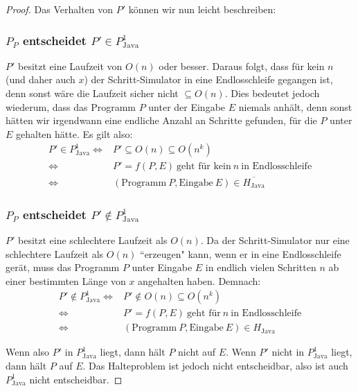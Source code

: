 \documentclass[journal]{IEEEtran}
\begin{document}
\begin{proof}
Das Verhalten von $P'$ können wir nun leicht beschreiben:

\subsubsection{$P_P$ entscheidet $P' \in P_\text{Java}^1$}

$P'$ besitzt eine Laufzeit von $O(n)$ oder besser. Daraus folgt, dass für kein $n$ (und daher auch $x$) der Schritt-Simulator in eine Endlosschleife gegangen ist, denn sonst wäre die Laufzeit sicher nicht $\subseteq O(n)$. Dies bedeutet jedoch wiederum, dass das Programm $P$ unter der Eingabe $E$ niemals anhält, denn sonst hätten wir irgendwann eine endliche Anzahl an Schritte gefunden, für die $P$ unter $E$ gehalten hätte. Es gilt also:
\begin{align*}
P' \in P_\text{Java}^1
\Leftrightarrow& P' \subseteq O(n) \subseteq O(n^k) \\
\Leftrightarrow& P' = f(P, E) \ \text{geht f\"ur kein} \  n \ \text{in Endlosschleife} \\
\Leftrightarrow& (\text{Programm} \ P, \text{Eingabe} \ E) \in \overline{H_\text{Java}}
\end{align*}

\subsubsection{$P_P$ entscheidet $P' \notin P_\text{Java}^1$}

$P'$ besitzt eine schlechtere Laufzeit als $O(n)$. Da der Schritt-Simulator nur eine schlechtere Laufzeit als $O(n)$ ``erzeugen" kann, wenn er in eine Endlosschleife gerät, muss das Programm $P$ unter Eingabe $E$ in endlich vielen Schritten $n$ ab einer bestimmten Länge von $x$ angehalten haben. Demnach:
\begin{align*}
P' \notin P_\text{Java}^1
\Leftrightarrow& P' \notin O(n) \subseteq O(n^k) \\
\Leftrightarrow& P' = f(P, E) \ \text{geht f\"ur} \  n \ \text{in Endlosschleife} \\
\Leftrightarrow& (\text{Programm} \ P, \text{Eingabe} \ E) \in H_\text{Java}
\end{align*}

Wenn also $P'$ in $P_\text{Java}^1$ liegt, dann hält $P$ nicht auf $E$. Wenn $P'$ nicht in $P_\text{Java}^1$ liegt, dann hält $P$ auf $E$. Das Halteproblem ist jedoch nicht entscheidbar, also ist auch $P_\text{Java}^1$ nicht entscheidbar.

\end{proof}
\end{document}
